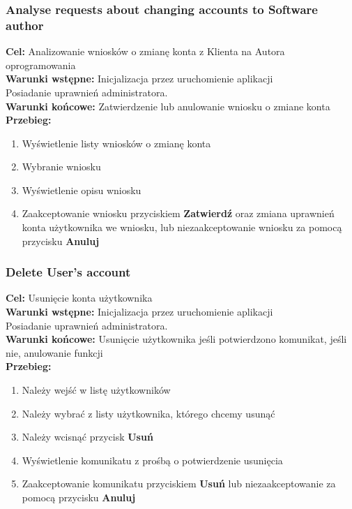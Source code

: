 \documentclass[12pt,a4paper]{article}
\begin{document}
\subsubsection{Analyse requests about changing accounts to Software author}
\textbf{Cel: } Analizowanie wniosków o zmianę konta z Klienta na Autora oprogramowania \\
\textbf{Warunki wstępne:} Inicjalizacja przez uruchomienie aplikacji\\ Posiadanie uprawnień administratora.\\
\textbf{Warunki końcowe:} Zatwierdzenie lub anulowanie wniosku o zmiane konta\\
\textbf{Przebieg:}
\begin{enumerate}
    \item Wyświetlenie listy wniosków o zmianę konta
    \item Wybranie wniosku
    \item Wyświetlenie opisu wniosku
    \item Zaakceptowanie wniosku przyciskiem \textbf{Zatwierdź} oraz zmiana uprawnień konta użytkownika we wniosku, lub niezaakceptowanie wniosku za pomocą przycisku \textbf{Anuluj}
\end{enumerate}

\subsubsection{Delete User's account}
\textbf{Cel: } Usunięcie konta użytkownika \\
\textbf{Warunki wstępne:} Inicjalizacja przez uruchomienie aplikacji\\ Posiadanie uprawnień administratora.\\
\textbf{Warunki końcowe:} Usunięcie użytkownika jeśli potwierdzono komunikat, jeśli nie, anulowanie funkcji\\
\textbf{Przebieg:}
\begin{enumerate}
    \item Należy wejść w listę użytkowników
    \item Należy wybrać z listy użytkownika, którego chcemy usunąć
    \item Należy wcisnąć przycisk \textbf{Usuń}
    \item Wyświetlenie komunikatu z prośbą o potwierdzenie usunięcia
    \item Zaakceptowanie komunikatu przyciskiem \textbf{Usuń} lub niezaakceptowanie za pomocą przycisku \textbf{Anuluj}
\end{enumerate}
\end{document}
